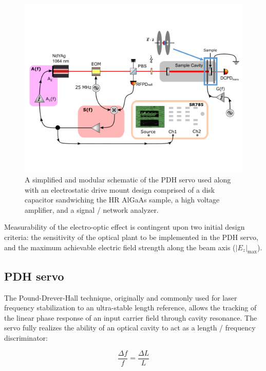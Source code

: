 \begin{figure}[H]
	\includegraphics[width=\textwidth]{figs/ALGAAS/algaas_pockels_effect_measurement_schematic.pdf}
	\caption{A simplified and modular schematic of the PDH servo used along with an electrostatic drive mount design comprised of a disk capacitor sandwiching the HR AlGaAs sample, a high voltage amplifier, and a signal / network analyzer.}
\label{fig:simpschema}
\end{figure}
 Measurability of the electro-optic effect is contingent upon two initial design criteria: the sensitivity of the optical plant to be implemented in the PDH servo, and the maximum achievable electric field strength along the beam axis ($|E_z|_\mathrm{max}$).

\subsection{PDH servo}\label{subsubsec:pdh}
The Pound-Drever-Hall technique, originally and commonly used for laser frequency stabilization to an ultra-stable length reference, allows the tracking of the linear phase response of an input carrier field through cavity resonance. The servo fully realizes the ability of an optical cavity to act as a length / frequency discriminator:

\begin{equation}\label{eq:cavlf}
	\frac{\Delta f}{f} = \frac{\Delta L}{L}
\end{equation}

